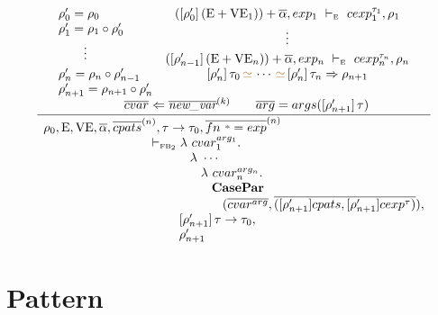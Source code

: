 \documentclass[11pt,a4paper]{article}
\newcommand{\key}[1]{\textrm{\textbf{#1}}}
\newcommand{\unifylist}[3]{#1\,{\color{brown}{\simeq}}\,\cdots\,{\color{brown}{\simeq}}\,#2 \Rightarrow #3}
\newcommand{\subst}[2]{[#1]\,#2}
\newcommand{\wildcard}{{\color{gray}\scriptstyle\textbf{*}}}
\newcommand{\compose}[2]{#1 \circ #2}
\newcommand{\Env}  {\textrm{E}}
\newcommand{\VE}   {\textrm{VE}}
\newcommand{\sFB}   {\textrm{\tiny FB}}
\newcommand{\lam}  {\mathbf\lambda}
\newcommand{\vdashE}  {\ \vdash_{\textrm{\tiny E}}\  }
\newcommand{\corenew}[1]{\textit{new\_#1}}
\newcommand{\vect}[1]{\overline{#1}}
\begin{document}
\[
\cfrac
 {\begin{array}{lc}
  \rho'_0 = \rho_0 
  & (\subst{\rho'_0}    (\Env+\VE_1)) + \vect\alpha, exp_1 \vdashE cexp_1^{\tau_1},\rho_1 \\
  \rho'_1 = \compose{\rho_1}{\rho'_0} & \multirow{2}{*}{\vdots} \\
  \multirow{2}{*}{\qquad\vdots}  &  \\
  & (\subst{\rho'_{n-1}}(\Env+\VE_n)) + \vect\alpha, exp_n \vdashE cexp_n^{\tau_n},\rho_n \\
  \rho'_n = \compose{\rho_n}{\rho'_{n-1}}
  & \unifylist{\subst{\rho'_n}{\tau_0}}{\subst{\rho'_n}{\tau_n}}{\rho_{n+1}} \\ 
  \rho'_{n+1} = \compose{\rho_{n+1}}{\rho'_n}
  & \\
  \multicolumn{2}{c}{\qquad \vect{cvar} \Leftarrow \vect{\corenew{var}}^{(k)} \qquad \vect{arg} = args(\subst{\rho'_{n+1}}{\tau})} \\
  \end{array}
 }
 {\begin{array}{l}
  \rho_0,\Env,\VE,\vect\alpha,\vect{cpats}^{(n)},\tau\to\tau_0,\vect{fn\ \wildcard = exp}^{(n)} \\
  \hspace{20ex}\vdash_{\sFB_2} \lam\ cvar_1^{arg_1}.      \\
  \hspace{25ex}\hspace{2ex}\lam\ \cdots                   \\
  \hspace{25ex}\hspace{4ex}\lam\ cvar_n^{arg_n}.          \\
  \hspace{25ex}\hspace{6ex}\key{CasePar}					        \\
  \hspace{25ex}\hspace{8ex}(\vect{cvar^{arg}},\vect{([\rho'_{n+1}]cpats, [\rho'_{n+1}]cexp^\tau)}),\\
  \hspace{25ex}\subst{\rho'_{n+1}}{\tau\to\tau_0},                  \\
  \hspace{25ex}\rho'_{n+1}                                          \\
  \end{array}}
\]

\section {Pattern}
\end{document}
